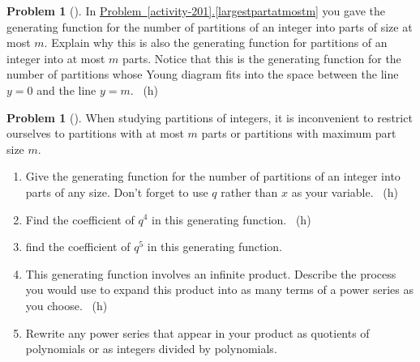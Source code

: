 \documentclass[10pt,]{book}
\theoremstyle{plain}
\theoremstyle{definition}
\newtheorem{activity}[project]{Problem}
\theoremstyle{definition}
\numberwithin{equation}{chapter}
\begin{document}
\begin{activity}[] \label{atmostmparts}
\hypertarget{p-1150}{}%
In \hyperref[largestpartatmostm]{Problem~\ref{activity-201}.\ref{largestpartatmostm}} you gave the generating function for the number of partitions of an integer into parts of size at most \(m\). Explain why this is also the generating function for partitions of an integer into at most \(m\) parts. Notice that this is the generating function for the number of partitions whose Young diagram fits into the space between the line \(y=0\) and the line \(y=m\).%
~{\tiny (h)}\end{activity}
\begin{activity}[] \label{genfunpartitions}
\hypertarget{p-1153}{}%
When studying partitions of integers, it is inconvenient to restrict ourselves to partitions with at most \(m\) parts or partitions with maximum part size \(m\).%
\begin{enumerate}[font=\bfseries,label=(\alph*),ref=\alph*]
\item\label{task-141} \marginsymbol[-2.5em]{} \hypertarget{p-1154}{}%
Give the generating function for the number of partitions of an integer into parts of any size. Don't forget to use \(q\) rather than \(x\) as your variable.%
~{\tiny (h)}\item\label{task-142} \marginsymbol[-2.5em]{} \hypertarget{p-1157}{}%
Find the coefficient of \(q^4\) in this generating function.%
~{\tiny (h)}\item\label{task-143} \marginsymbol[-2.5em]{} \hypertarget{p-1160}{}%
find the coefficient of \(q^5\) in this generating function.%
\item\label{task-144} \marginsymbol[-2.5em]{} \hypertarget{p-1162}{}%
This generating function involves an infinite product. Describe the process you would use to expand this product into as many terms of a power series as you choose.%
~{\tiny (h)}\item\label{task-145} \marginsymbol[-2.5em]{} \hypertarget{p-1165}{}%
Rewrite any power series that appear in your product as quotients of polynomials or as integers divided by polynomials.%
\end{enumerate}
\end{activity}
\end{document}
